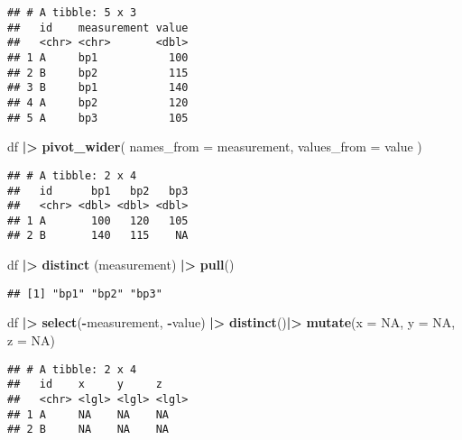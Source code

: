 \documentclass[
]{article}
\newenvironment{Shaded}{\begin{snugshade}}{\end{snugshade}}
\newcommand{\AttributeTok}[1]{\textcolor[rgb]{0.13,0.29,0.53}{#1}}
\newcommand{\ConstantTok}[1]{\textcolor[rgb]{0.56,0.35,0.01}{#1}}
\newcommand{\FunctionTok}[1]{\textcolor[rgb]{0.13,0.29,0.53}{\textbf{#1}}}
\newcommand{\NormalTok}[1]{#1}
\newcommand{\SpecialCharTok}[1]{\textcolor[rgb]{0.81,0.36,0.00}{\textbf{#1}}}
\begin{document}
\begin{verbatim}
## # A tibble: 5 x 3
##   id    measurement value
##   <chr> <chr>       <dbl>
## 1 A     bp1           100
## 2 B     bp2           115
## 3 B     bp1           140
## 4 A     bp2           120
## 5 A     bp3           105
\end{verbatim}

\begin{Shaded}
\begin{Highlighting}[]
\NormalTok{df }\SpecialCharTok{|\textgreater{}}
  \FunctionTok{pivot\_wider}\NormalTok{(}
    \AttributeTok{names\_from =}\NormalTok{ measurement,}
    \AttributeTok{values\_from =}\NormalTok{ value}
\NormalTok{  )}
\end{Highlighting}
\end{Shaded}

\begin{verbatim}
## # A tibble: 2 x 4
##   id      bp1   bp2   bp3
##   <chr> <dbl> <dbl> <dbl>
## 1 A       100   120   105
## 2 B       140   115    NA
\end{verbatim}

\begin{Shaded}
\begin{Highlighting}[]
\NormalTok{df }\SpecialCharTok{|\textgreater{}}
  \FunctionTok{distinct}\NormalTok{ (measurement) }\SpecialCharTok{|\textgreater{}}
  \FunctionTok{pull}\NormalTok{()}
\end{Highlighting}
\end{Shaded}

\begin{verbatim}
## [1] "bp1" "bp2" "bp3"
\end{verbatim}

\begin{Shaded}
\begin{Highlighting}[]
\NormalTok{df }\SpecialCharTok{|\textgreater{}}
  \FunctionTok{select}\NormalTok{(}\SpecialCharTok{{-}}\NormalTok{measurement, }\SpecialCharTok{{-}}\NormalTok{value) }\SpecialCharTok{|\textgreater{}}
  \FunctionTok{distinct}\NormalTok{()}\SpecialCharTok{|\textgreater{}}
  \FunctionTok{mutate}\NormalTok{(}\AttributeTok{x =} \ConstantTok{NA}\NormalTok{, }\AttributeTok{y =} \ConstantTok{NA}\NormalTok{, }\AttributeTok{z =} \ConstantTok{NA}\NormalTok{)}
\end{Highlighting}
\end{Shaded}

\begin{verbatim}
## # A tibble: 2 x 4
##   id    x     y     z    
##   <chr> <lgl> <lgl> <lgl>
## 1 A     NA    NA    NA   
## 2 B     NA    NA    NA
\end{verbatim}
\end{document}
